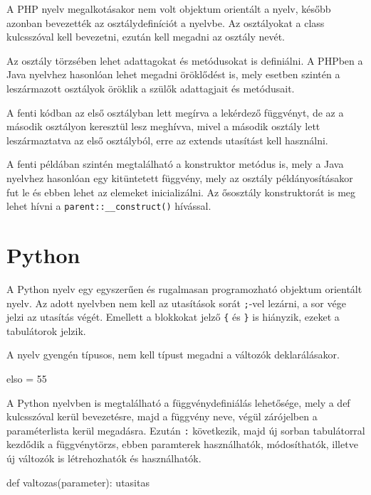 A PHP nyelv megalkotásakor nem volt objektum orientált a nyelv, később azonban bevezették az osztálydefiníciót a nyelvbe. Az osztályokat a class kulcsszóval kell bevezetni, ezután kell megadni az osztály nevét.

Az osztály törzsében lehet adattagokat és metódusokat is definiálni. A PHPben a Java nyelvhez hasonlóan lehet megadni öröklődést is, mely esetben szintén a leszármazott osztályok öröklik a szülők adattagjait és metódusait.

A fenti kódban az első osztályban lett megírva a lekérdező függvényt, de az a második osztályon keresztül lesz meghívva, mivel a második osztály lett leszármaztatva az első osztályból, erre az extends utasítást kell használni.

A fenti példában szintén megtalálható a konstruktor metódus is, mely a Java nyelvhez hasonlóan egy kitüntetett függvény, mely az osztály példányosításakor fut le és ebben lehet az elemeket inicializálni. Az ősosztály konstruktorát is meg lehet hívni a \texttt{parent::\_\_construct()} hívással.

\section{Python}

A Python nyelv egy egyszerűen és rugalmasan programozható objektum orientált nyelv.
Az adott nyelvben nem kell az utasítások sorát \texttt{;}-vel lezárni, a sor vége jelzi az utasítás végét. Emellett a blokkokat jelző \texttt{\{} és \texttt{\}} is hiányzik, ezeket a tabulátorok jelzik.

A nyelv gyengén típusos, nem kell típust megadni a változók deklarálásakor.
\begin{python}
elso = 55
\end{python}

A Python nyelvben is megtalálható a függvénydefiniálás lehetősége, mely a def kulcsszóval kerül bevezetésre, majd a függvény neve, végül zárójelben a paraméterlista kerül megadásra. Ezután \texttt{:} következik, majd új sorban tabulátorral kezdődik a függvénytörzs, ebben paramterek használhatók, módosíthatók, illetve új változók is létrehozhatók és használhatók.
\begin{python}
def valtozas(parameter):
	utasitas
\end{python}

